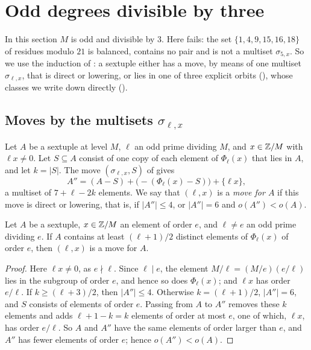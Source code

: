 \section{Odd degrees divisible by three}\label{sec:odd}

In this section $M$ is odd and divisible by $3$. Here 
fails: the set $\{1,4,9,15,16,18\}$ of residues modulo $21$ is balanced,
contains no pair and is not a multiset $\sigma_{5,x}$. So we use the
induction of : a sextuple either has a move, by means of
one multiset $\sigma_{\ell,x}$, that is direct or lowering, or lies in one of
three explicit orbits (), whose classes we write down
directly ().

\subsection{Moves by the multisets \texorpdfstring{$\sigma_{\ell,x}$}{sigma}}
Let $A$ be a sextuple at level $M$, $\ell$ an odd prime dividing $M$, and
$x\in\mathbb{Z}/M$ with $\ell x\ne0$. Let $S\subseteq A$ consist of one copy of each
element of $\Phi_{\ell}(x)$ that lies in $A$, and let $k=|S|$. The move
$(\sigma_{\ell,x},S)$ of  gives
\[
  A''=(A-S)+\bigl(-(\Phi_{\ell}(x)-S)\bigr)+\{\ell x\},
\]
a multiset of $7+\ell-2k$ elements. We say that $(\ell,x)$ is a \emph{move
for $A$} if this move is direct or lowering, that is, if $|A''|\le4$, or
$|A''|=6$ and $o(A'')<o(A)$.

\begin{lemma}\label{lem:movecrit}
Let $A$ be a sextuple, $x\in\mathbb{Z}/M$ an element of order $e$, and $\ell\ne e$
an odd prime dividing $e$. If $A$ contains at least $(\ell+1)/2$ distinct
elements of $\Phi_{\ell}(x)$ of order $e$, then $(\ell,x)$ is a move for $A$.
\end{lemma}

\begin{proof}
Here $\ell x\ne0$, as $e\nmid\ell$. Since $\ell\mid e$, the element
$M/\ell=(M/e)(e/\ell)$ lies in the subgroup of order $e$, and hence so does
$\Phi_{\ell}(x)$; and $\ell x$ has order $e/\ell$. If $k\ge(\ell+3)/2$, then
$|A''|\le4$. Otherwise $k=(\ell+1)/2$, $|A''|=6$, and $S$ consists of
elements of order $e$. Passing from $A$ to $A''$ removes these $k$ elements
and adds $\ell+1-k=k$ elements of order at most $e$, one of which, $\ell x$,
has order $e/\ell$. So $A$ and $A''$ have the same elements of order larger
than $e$, and $A''$ has fewer elements of order $e$; hence $o(A'')<o(A)$.
\end{proof}

